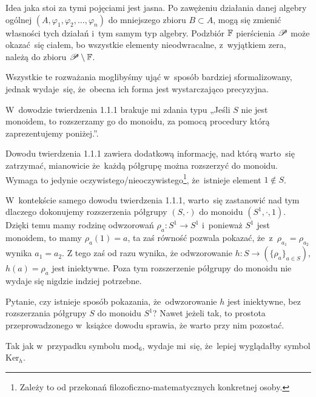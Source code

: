 \documentclass[a4paper,11pt]{article}
\begin{document}
Idea jaka stoi za tymi pojęciami jest jasna. Po zawężeniu działania danej
algebry ogólnej $( A, \varphi_{ 1 }, \varphi_{ 2 }, \ldots, \varphi_{ n } )$ do mniejszego zbioru
$B \subset A$, mogą się zmienić własności tych działań i~tym samym typ algebry.
Podzbiór $\mathbb{F}$ pierścienia $\mathcal{P}$ może okazać~się ciałem, bo wszystkie
elementy nieodwracalne, z~wyjątkiem zera, należą do zbioru $\mathcal{P} \setminus \mathbb{F}$.

Wszystkie te rozważania moglibyśmy ująć w~sposób bardziej sformalizowany,
jednak wydaje~się, że~obecna ich forma jest wystarczająco precyzyjna.

\vspace{\spaceFour}



\start {} W~dowodzie twierdzenia 1.1.1 brakuje mi zdania typu
„Jeśli $S$ nie jest monoidem, to rozszerzamy go do monoidu, za pomocą
procedury którą zaprezentujemy poniżej.”.

\vspace{\spaceFour}



\start {} Dowodu twierdzenia 1.1.1 zawiera dodatkową informację,
nad którą warto~się zatrzymać, mianowicie że~każdą półgrupę można
rozszerzyć do monoidu. Wymaga to jedynie
oczywistego/nieoczywistego\footnote{Zależy to od przekonań
  filozoficzno-matematycznych konkretnej osoby.}, że~istnieje element
$1 \notin S$.

W~kontekście samego dowodu twierdzenia 1.1.1, warto~się zastanowić nad
tym dlaczego dokonujemy rozszerzenia półgrupy $( S, \cdot )$ do
monoidu $( S^{ 1 }, \cdot, 1 )$. Dzięki temu mamy rodzinę odwzorowań
$\rho_{ a } : S^{ 1 } \to S^{ 1 }$ i~ponieważ $S^{ 1 }$ jest monoidem,
to mamy $\rho_{ a }( 1 ) = a$, ta zaś równość pozwala pokazać,
że~z~$\rho_{ a_{ 1 } } = \rho_{ a_{ 2 } }$ wynika $a_{ 1 } = a_{ 2 }$.
Z tego zaś od razu wynika, że odwzorowanie
$h : S \to ( \{ \rho_{ a } \}_{ a \in S } )$, $h( a ) = \rho_{ a }$
jest iniektywne. Poza tym rozszerzenie półgrupy do monoidu nie wydaje
się nigdzie indziej potrzebne.

Pytanie, czy istnieje sposób pokazania, że~odwzorowanie $h$ jest
iniektywne, bez rozszerzania półgrupy $S$ do monoidu $S^{ 1 }$? Nawet
jeżeli tak, to prostota przeprowadzonego w~książce dowodu sprawia, że
warto przy nim pozostać.

\vspace{\spaceFour}



\start {} Tak jak w~przypadku symbolu $\textrm{mod}_{ 6 }$,
wydaje mi~się, że~lepiej wyglądałby symbol $\textrm{Ker}_{ h }$.
\end{document}
